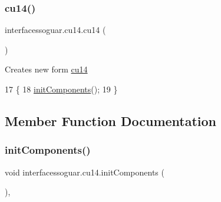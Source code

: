 \subsubsection{\texorpdfstring{cu14()}{cu14()}}
{\footnotesize\ttfamily interfacessoguar.\+cu14.\+cu14 (\begin{DoxyParamCaption}{ }\end{DoxyParamCaption})\hspace{0.3cm}{\ttfamily [inline]}}

Creates new form \mbox{\hyperlink{classinterfacessoguar_1_1cu14}{cu14}} 
\begin{DoxyCode}
17                   \{
18         \mbox{\hyperlink{classinterfacessoguar_1_1cu14_af595a2c979588bc79be0ca6bd0a87fb5}{initComponents}}();
19     \}
\end{DoxyCode}


\subsection{Member Function Documentation}
\mbox{\label{classinterfacessoguar_1_1cu14_af595a2c979588bc79be0ca6bd0a87fb5}} 
\subsubsection{\texorpdfstring{init\+Components()}{initComponents()}}
{\footnotesize\ttfamily void interfacessoguar.\+cu14.\+init\+Components (\begin{DoxyParamCaption}{ }\end{DoxyParamCaption})\hspace{0.3cm}{\ttfamily [inline]}, {\ttfamily [private]}}

